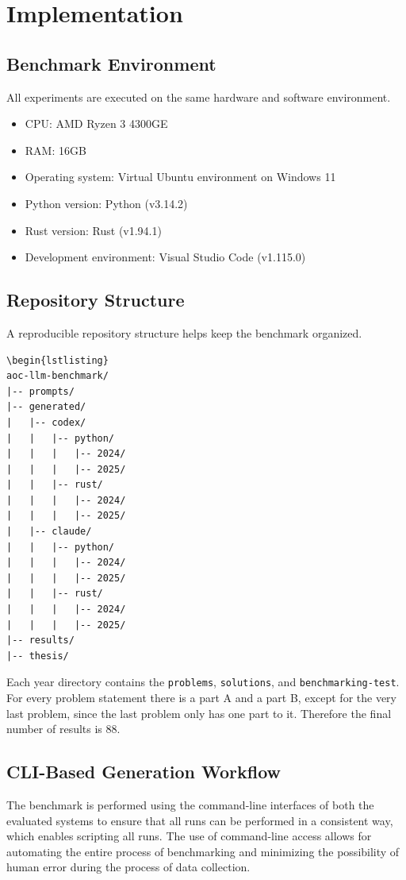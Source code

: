 \documentclass[12pt,a4paper]{report}
\begin{document}
\chapter{Implementation}

\section{Benchmark Environment}
All experiments are executed on the same hardware and software environment. 
\begin{itemize}
    \item CPU: AMD Ryzen 3 4300GE
    \item RAM: 16GB
    \item Operating system: Virtual Ubuntu environment on Windows 11 
    \item Python version: Python (v3.14.2)
    \item Rust version: Rust (v1.94.1)
    \item Development environment: Visual Studio Code (v1.115.0)
\end{itemize}

\section{Repository Structure}
A reproducible repository structure helps keep the benchmark organized. 

\begin{lstlisting}
\begin{lstlisting}
aoc-llm-benchmark/
|-- prompts/
|-- generated/
|   |-- codex/
|   |   |-- python/
|   |   |   |-- 2024/
|   |   |   |-- 2025/
|   |   |-- rust/
|   |   |   |-- 2024/
|   |   |   |-- 2025/
|   |-- claude/
|   |   |-- python/
|   |   |   |-- 2024/
|   |   |   |-- 2025/
|   |   |-- rust/
|   |   |   |-- 2024/
|   |   |   |-- 2025/
|-- results/
|-- thesis/
\end{lstlisting}
Each year directory contains the \texttt{problems}, \texttt{solutions}, and \texttt{benchmarking-test}. For every problem statement there is a part A and a part B, except for the very last problem, since the last problem only has one part to it. Therefore the final number of results is 88.

\section{CLI-Based Generation Workflow}
The benchmark is performed using the command-line interfaces of both the evaluated systems to ensure that all runs can be performed in a consistent way, which enables scripting all runs. The use of command-line access allows for automating the entire process of benchmarking and minimizing the possibility of human error during the process of data collection.
\end{document}
